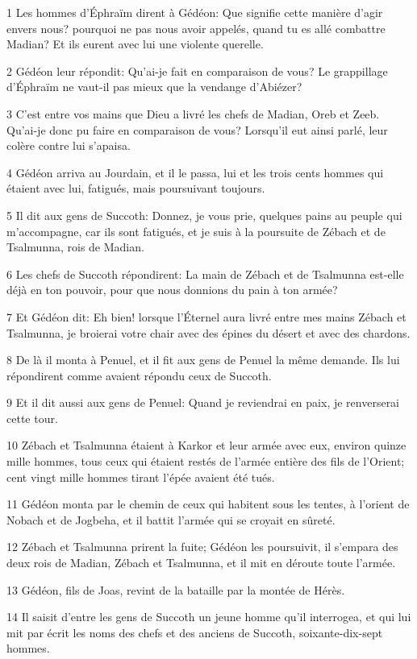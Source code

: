 \par 1 Les hommes d'Éphraïm dirent à Gédéon: Que signifie cette manière d'agir envers nous? pourquoi ne pas nous avoir appelés, quand tu es allé combattre Madian? Et ils eurent avec lui une violente querelle.
\par 2 Gédéon leur répondit: Qu'ai-je fait en comparaison de vous? Le grappillage d'Éphraïm ne vaut-il pas mieux que la vendange d'Abiézer?
\par 3 C'est entre vos mains que Dieu a livré les chefs de Madian, Oreb et Zeeb. Qu'ai-je donc pu faire en comparaison de vous? Lorsqu'il eut ainsi parlé, leur colère contre lui s'apaisa.
\par 4 Gédéon arriva au Jourdain, et il le passa, lui et les trois cents hommes qui étaient avec lui, fatigués, mais poursuivant toujours.
\par 5 Il dit aux gens de Succoth: Donnez, je vous prie, quelques pains au peuple qui m'accompagne, car ils sont fatigués, et je suis à la poursuite de Zébach et de Tsalmunna, rois de Madian.
\par 6 Les chefs de Succoth répondirent: La main de Zébach et de Tsalmunna est-elle déjà en ton pouvoir, pour que nous donnions du pain à ton armée?
\par 7 Et Gédéon dit: Eh bien! lorsque l'Éternel aura livré entre mes mains Zébach et Tsalmunna, je broierai votre chair avec des épines du désert et avec des chardons.
\par 8 De là il monta à Penuel, et il fit aux gens de Penuel la même demande. Ils lui répondirent comme avaient répondu ceux de Succoth.
\par 9 Et il dit aussi aux gens de Penuel: Quand je reviendrai en paix, je renverserai cette tour.
\par 10 Zébach et Tsalmunna étaient à Karkor et leur armée avec eux, environ quinze mille hommes, tous ceux qui étaient restés de l'armée entière des fils de l'Orient; cent vingt mille hommes tirant l'épée avaient été tués.
\par 11 Gédéon monta par le chemin de ceux qui habitent sous les tentes, à l'orient de Nobach et de Jogbeha, et il battit l'armée qui se croyait en sûreté.
\par 12 Zébach et Tsalmunna prirent la fuite; Gédéon les poursuivit, il s'empara des deux rois de Madian, Zébach et Tsalmunna, et il mit en déroute toute l'armée.
\par 13 Gédéon, fils de Joas, revint de la bataille par la montée de Hérès.
\par 14 Il saisit d'entre les gens de Succoth un jeune homme qu'il interrogea, et qui lui mit par écrit les noms des chefs et des anciens de Succoth, soixante-dix-sept hommes.
